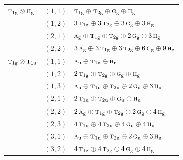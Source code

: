 \documentclass[11pt]{article}
\newcommand{\irr}[1]{\text{\normalfont\scshape #1}}
\newcommand{\ptag}[1]{\mathrm{#1}}
\begin{document}
\begin{longtable}{p{} c p{}}
\hline

$\irr{t}_{1\ptag{g}}\otimes \irr{h}_{\ptag{g}}$ & $(1,1)$ & $\irr{t}_{1\ptag{g}}\oplus \irr{t}_{2\ptag{g}}\oplus \irr{g}_{\ptag{g}}\oplus \irr{h}_{\ptag{g}}$\\

 & $(1,2)$ & $3\,\irr{t}_{1\ptag{g}}\oplus 3\,\irr{t}_{2\ptag{g}}\oplus 3\,\irr{g}_{\ptag{g}}\oplus 3\,\irr{h}_{\ptag{g}}$\\

 & $(2,1)$ & $\irr{a}_{\ptag{g}}\oplus \irr{t}_{1\ptag{g}}\oplus \irr{t}_{2\ptag{g}}\oplus 2\,\irr{g}_{\ptag{g}}\oplus 3\,\irr{h}_{\ptag{g}}$\\

 & $(2,2)$ & $3\,\irr{a}_{\ptag{g}}\oplus 3\,\irr{t}_{1\ptag{g}}\oplus 3\,\irr{t}_{2\ptag{g}}\oplus 6\,\irr{g}_{\ptag{g}}\oplus 9\,\irr{h}_{\ptag{g}}$\\

\hline

$\irr{t}_{1\ptag{g}}\otimes \irr{t}_{1\ptag{u}}$ & $(1,1)$ & $\irr{a}_{\ptag{u}}\oplus \irr{t}_{1\ptag{u}}\oplus \irr{h}_{\ptag{u}}$\\

 & $(1,2)$ & $2\,\irr{t}_{1\ptag{g}}\oplus \irr{t}_{2\ptag{g}}\oplus \irr{g}_{\ptag{g}}\oplus \irr{h}_{\ptag{g}}$\\

 & $(1,3)$ & $\irr{a}_{\ptag{u}}\oplus \irr{t}_{1\ptag{u}}\oplus \irr{t}_{2\ptag{u}}\oplus 2\,\irr{g}_{\ptag{u}}\oplus 3\,\irr{h}_{\ptag{u}}$\\

 & $(2,1)$ & $2\,\irr{t}_{1\ptag{u}}\oplus \irr{t}_{2\ptag{u}}\oplus \irr{g}_{\ptag{u}}\oplus \irr{h}_{\ptag{u}}$\\

 & $(2,2)$ & $2\,\irr{a}_{\ptag{g}}\oplus \irr{t}_{1\ptag{g}}\oplus \irr{t}_{2\ptag{g}}\oplus 2\,\irr{g}_{\ptag{g}}\oplus 4\,\irr{h}_{\ptag{g}}$\\

 & $(2,3)$ & $4\,\irr{t}_{1\ptag{u}}\oplus 4\,\irr{t}_{2\ptag{u}}\oplus 4\,\irr{g}_{\ptag{u}}\oplus 4\,\irr{h}_{\ptag{u}}$\\

 & $(3,1)$ & $\irr{a}_{\ptag{u}}\oplus \irr{t}_{1\ptag{u}}\oplus \irr{t}_{2\ptag{u}}\oplus 2\,\irr{g}_{\ptag{u}}\oplus 3\,\irr{h}_{\ptag{u}}$\\

 & $(3,2)$ & $4\,\irr{t}_{1\ptag{g}}\oplus 4\,\irr{t}_{2\ptag{g}}\oplus 4\,\irr{g}_{\ptag{g}}\oplus 4\,\irr{h}_{\ptag{g}}$\\


\end{longtable}
\end{document}
